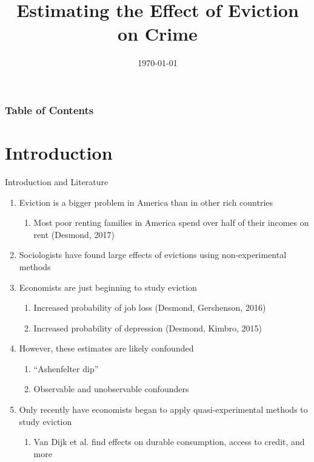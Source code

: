 \documentclass [xcolor=svgnames, t] {beamer}
\title[Eviction and Property Values]{Estimating the Effect of Eviction on Crime}
\author[Arjun Shanmugam]{}
\date{\today}
\begin{document}
\begin{frame}
\maketitle
\end{frame}


\begin{frame}
\frametitle{Table of Contents}
\tableofcontents
\end{frame}

\section{Introduction}
\begin{frame}{Introduction and Literature}
   \begin{enumerate}
       \item Eviction is a bigger problem in America than in other rich countries
       \begin{enumerate}
           \item Most poor renting families in America
spend over half of their incomes on rent (Desmond, 2017)
       \end{enumerate}
       \item Sociologists have found large effects of evictions using non-experimental methods
       \item Economists are just beginning to study eviction
       \begin{enumerate}
           \item Increased probability of job loss (Desmond, Gershenson, 2016)
           \item Increased probability of depression (Desmond, Kimbro, 2015)
       \end{enumerate} 
       \item However, these estimates are likely confounded
       \begin{enumerate}
           \item ``Ashenfelter dip''
           \item Observable and unobservable confounders
       \end{enumerate}
       \item Only recently have economists began to apply quasi-experimental methods to study eviction
        \begin{enumerate}
            \item Van Dijk et al. find effects on durable consumption, access to credit, and more
        \end{enumerate}
   \end{enumerate}
\end{frame}
\end{document}
